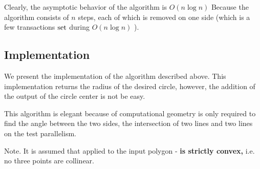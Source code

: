 Clearly, the asymptotic behavior of the algorithm is $O (n \log n)$ Because the algorithm consists of $n$ steps, each of which is removed on one side (which is a few transactions $\rm set$ during $O (n \log n)$ ).

\subsection{ Implementation }

We present the implementation of the algorithm described above. This implementation returns the radius of the desired circle, however, the addition of the output of the circle center is not be easy.

This algorithm is elegant because of computational geometry is only required to find the angle between the two sides, the intersection of two lines and two lines on the test parallelism.

Note. It is assumed that applied to the input polygon - \textbf{is strictly convex,} i.e. no three points are collinear.

